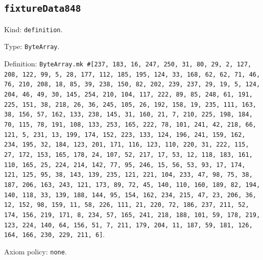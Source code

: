 \documentclass[11pt]{article}
\begin{document}
\subsection*{\texttt{fixtureData848}}
\noindent Kind: \texttt{definition}.\par
\noindent Type: \texttt{ByteArray}.\par
\noindent Definition: \texttt{ByteArray.mk \#[237, 183, 16, 247, 250, 31, 80, 29, 2, 127, 208, 122, 99, 5, 28, 177, 112, 185, 195, 124, 33, 168, 62, 62, 71, 46, 76, 210, 208, 18, 85, 39, 238, 150, 82, 202, 239, 237, 29, 19, 5, 124, 204, 46, 49, 30, 145, 254, 210, 104, 117, 222, 89, 85, 248, 61, 191, 225, 151, 38, 218, 26, 36, 245, 105, 26, 192, 158, 19, 235, 111, 163, 38, 156, 57, 162, 133, 238, 145, 31, 160, 21, 7, 210, 225, 198, 184, 70, 115, 78, 191, 108, 133, 253, 165, 222, 78, 101, 241, 42, 218, 66, 121, 5, 231, 13, 199, 174, 152, 223, 133, 124, 196, 241, 159, 162, 234, 195, 32, 184, 123, 201, 171, 116, 123, 110, 220, 31, 222, 115, 27, 172, 153, 165, 178, 24, 107, 52, 217, 17, 53, 12, 118, 183, 161, 110, 165, 25, 224, 214, 142, 77, 95, 246, 15, 56, 53, 93, 17, 174, 121, 125, 95, 38, 143, 139, 235, 121, 221, 104, 233, 47, 98, 75, 38, 187, 206, 163, 243, 121, 173, 89, 72, 45, 140, 110, 160, 189, 82, 194, 140, 118, 33, 139, 188, 144, 95, 154, 162, 234, 215, 47, 23, 206, 36, 12, 152, 98, 159, 11, 58, 226, 111, 21, 220, 72, 186, 237, 211, 52, 174, 156, 219, 171, 8, 234, 57, 165, 241, 218, 188, 101, 59, 178, 219, 123, 224, 140, 64, 156, 51, 7, 211, 179, 204, 11, 187, 59, 181, 126, 164, 166, 230, 229, 211, 6]}.\par
\noindent Axiom policy: \texttt{none}.\par
\end{document}
